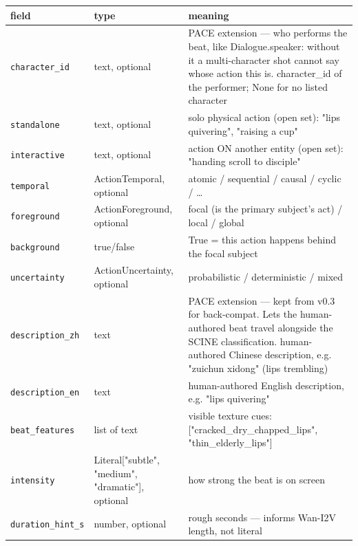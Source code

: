 \begin{longtable}{@{}R{0.24\textwidth}R{0.21\textwidth}R{0.49\textwidth}@{}}
\toprule \textbf{field} & \textbf{type} & \textbf{meaning} \\ \midrule
\endhead
\texttt{character\_\allowbreak id} & text, optional & PACE extension ---\allowbreak{} who performs the beat, like Dialogue.speaker: without it a multi-character shot cannot say whose action this is. character\_\allowbreak id of the performer; None for no listed character \\
\texttt{standalone} & text, optional & solo physical action (open set): "lips quivering", "raising a cup" \\
\texttt{interactive} & text, optional & action ON another entity (open set): "handing scroll to disciple" \\
\texttt{temporal} & ActionTemporal, optional & atomic /\allowbreak{} sequential /\allowbreak{} causal /\allowbreak{} cyclic /\allowbreak{} \ldots{} \\
\texttt{foreground} & ActionForeground, optional & focal (is the primary subject's act) /\allowbreak{} local /\allowbreak{} global \\
\texttt{background} & true/\allowbreak{}false & True = this action happens behind the focal subject \\
\texttt{uncertainty} & ActionUncertainty, optional & probabilistic /\allowbreak{} deterministic /\allowbreak{} mixed \\
\texttt{description\_\allowbreak zh} & text & PACE extension ---\allowbreak{} kept from v0.3 for back-compat. Lets the human- authored beat travel alongside the SCINE classification. human-authored Chinese description, e.g. "zuichun xidong" (lips trembling) \\
\texttt{description\_\allowbreak en} & text & human-authored English description, e.g. "lips quivering" \\
\texttt{beat\_\allowbreak features} & list of text & visible texture cues: ["cracked\_\allowbreak dry\_\allowbreak chapped\_\allowbreak lips", "thin\_\allowbreak elderly\_\allowbreak lips"] \\
\texttt{intensity} & Literal["subtle", \allowbreak "medium", \allowbreak "dramatic"], optional & how strong the beat is on screen \\
\texttt{duration\_\allowbreak hint\_\allowbreak s} & number, optional & rough seconds ---\allowbreak{} informs Wan-I2V length, not literal \\
\bottomrule
\end{longtable}

